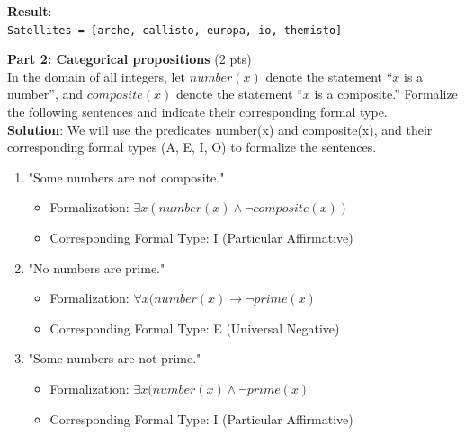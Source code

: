\documentclass[12pt]{article}
\begin{document}
\begin{spacing}{1.5}
\begin{enumerate}
		      \textbf{Result}:\\
		      \texttt{Satellites = [arche, callisto, europa, io, themisto]}\\
	\end{enumerate}
						
	\noindent \textbf{Part 2: Categorical propositions} (2 pts)\\
	In the domain of all integers, let $number(x)$ denote the statement “$x$ is a number”, and $composite(x)$ denote the statement “$x$ is a composite.” Formalize the following sentences and indicate their corresponding formal type.\\
					
	\textbf{Solution}: We will use the predicates number(x) and composite(x), and their corresponding formal types (A, E, I, O) to formalize the sentences.
						
	\begin{enumerate}
		\item "Some numbers are not composite."
		      		      		      		      		      
		      \begin{itemize}
		      	\item Formalization: $\exists x(number(x) \land \neg composite(x))$
		      	\item Corresponding Formal Type: I (Particular Affirmative)
		      \end{itemize}
		      		      		      		      		        
		\item "No numbers are prime."
		      		      		      		      		      
		      \begin{itemize}
		      	\item Formalization: $\forall x (number(x) \rightarrow \neg prime(x)$
		      	\item Corresponding Formal Type: E (Universal Negative)
		      \end{itemize}
		      		      		      		      		        
		\item "Some numbers are not prime."
		      		      		      		      		      
		      \begin{itemize}
		      	\item Formalization: $\exists x(number(x) \land \neg prime(x)$
		      	\item Corresponding Formal Type: I (Particular Affirmative)
		      \end{itemize}
		      		      		      		      		        

\end{enumerate}
\end{spacing}
\end{document}
